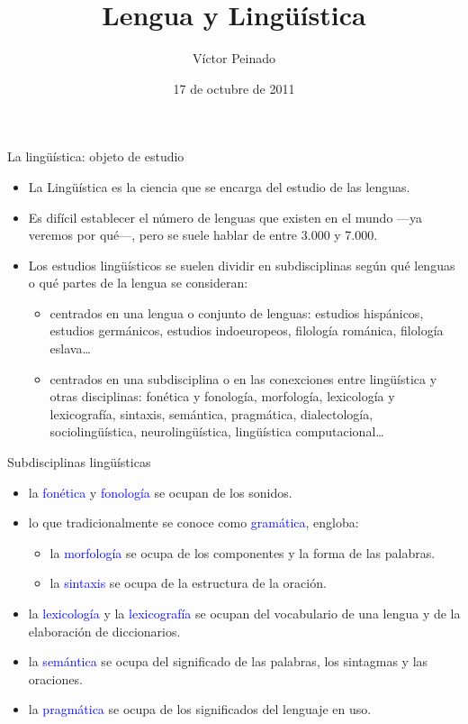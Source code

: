 \documentclass[handout]{beamer}
\title[Comunicación]{Lengua y Lingüística}
\author[V. Peinado]{Víctor Peinado}
\institute[UCM]{
  \texttt{v.peinado@filol.ucm.es}\\[1ex]
  
  Grado de Logopedia, Universidad Complutense de Madrid\\[1ex]
}
\date[Noviembre 2011]{17 de octubre de 2011}
\begin{document}
\begin{frame}[plain]
  \titlepage
\end{frame}


\begin{frame}{La lingüística: objeto de estudio}

\begin{itemize}
	\item La Lingüística es la ciencia que se encarga del estudio de las lenguas.
	\item Es difícil establecer el número de lenguas que existen en el mundo ---ya veremos por qué---, pero se suele hablar de entre 3.000 y 7.000.
	\item Los estudios lingüísticos se suelen dividir en subdisciplinas según qué lenguas o qué partes de la lengua se consideran:
	\begin{itemize}
		\item centrados en una lengua o conjunto de lenguas: estudios hispánicos, estudios germánicos, estudios indoeuropeos, filología románica, filología eslava\ldots
		\item centrados en una subdisciplina o en las conexciones entre lingüística y otras disciplinas: fonética y fonología, morfología, lexicología y lexicografía, sintaxis, semántica, pragmática, dialectología, sociolingüística, neurolingüística, lingüística computacional\ldots
	\end{itemize}
\end{itemize}

\end{frame}

\begin{frame}{Subdisciplinas lingüísticas}

\begin{itemize}
	\item la \textcolor{blue}{fonética} y \textcolor{blue}{fonología} se ocupan de los sonidos.
	\item lo que tradicionalmente se conoce como \textcolor{blue}{gramática}, engloba:
	\begin{itemize}
		\item la \textcolor{blue}{morfología} se ocupa de los componentes y la forma de las palabras.
		\item la \textcolor{blue}{sintaxis} se ocupa de la estructura de la oración.
	\end{itemize}
	\item la \textcolor{blue}{lexicología} y la \textcolor{blue}{lexicografía} se ocupan del vocabulario de una lengua y de la elaboración de diccionarios.
	\item la \textcolor{blue}{semántica} se ocupa del significado de las palabras, los sintagmas y las oraciones.
	\item la \textcolor{blue}{pragmática} se ocupa de los significados del lenguaje en uso.

\end{itemize}

\end{frame}
\end{document}
